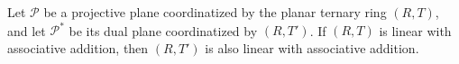 Let $\mathcal{P}$ be a projective plane coordinatized by the planar ternary ring $(R, T)$, and let $\mathcal{P}^*$ be its dual plane coordinatized by $(R, T')$. If $(R, T)$ is linear with associative addition, then $(R, T')$ is also linear with associative addition.
